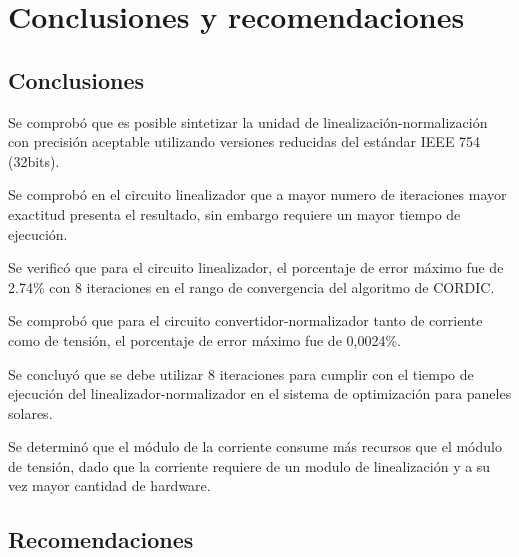 \chapter{Conclusiones y recomendaciones}

\section{Conclusiones}

\begin{compactitem}

\item Se comprobó que es posible sintetizar la unidad de linealización-normalización con precisión aceptable utilizando versiones reducidas del estándar IEEE 754 (32bits).

\item Se comprobó en el circuito linealizador que a mayor numero de iteraciones mayor exactitud presenta el resultado, sin embargo requiere un mayor tiempo de ejecución.  

\item Se verificó que para el circuito linealizador, el porcentaje de error máximo  fue de 2.74\% con 8 iteraciones en el rango de convergencia del algoritmo de CORDIC. 

\item Se comprobó que para el circuito convertidor-normalizador tanto de corriente como de tensión, el porcentaje de error máximo fue de 0,0024\%.

\item Se concluyó que se debe utilizar 8 iteraciones para cumplir con el tiempo de ejecución del linealizador-normalizador en el sistema de optimización para paneles solares. 

\item Se determinó que el módulo de la corriente consume más recursos que el módulo de tensión, dado que la corriente requiere de un modulo de linealización y a su vez mayor cantidad de hardware. 


\end{compactitem}

\section{Recomendaciones}

